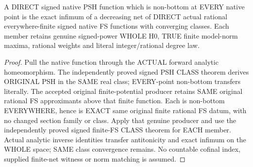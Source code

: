 \begin{theorem}
\label{thm:seven-native-signed-finite-net-promotion}
\leanok
A DIRECT signed native PSH function which is non-bottom at EVERY native
point is the exact infimum of a decreasing net of DIRECT actual rational
everywhere-finite signed native FS functions with converging classes.
Each member retains genuine signed-power WHOLE H0, TRUE finite model-norm
maxima, rational weights and literal integer/rational degree law.
\end{theorem}
\begin{proof}
Pull the native function through the ACTUAL forward analytic homeomorphism.
The independently proved signed PSH CLASS theorem derives ORIGINAL PSH
in the SAME real class; EVERY-point non-bottom transfers literally.
The accepted original finite-potential producer retains SAME original
rational FS approximants above that finite function. Each is non-bottom
EVERYWHERE, hence is EXACT same original finite rational FS datum, with
no changed section family or class. Apply that genuine producer and
use the independently proved signed finite-FS CLASS theorem for EACH
member. Actual analytic inverse identities transfer antitonicity and
exact infimum on the WHOLE space; SAME class convergence remains. No
countable cofinal index, supplied finite-net witness or norm matching
is assumed.
\end{proof}

